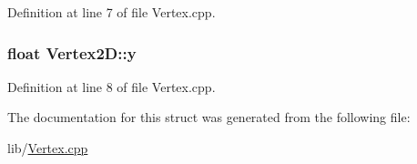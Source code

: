 Definition at line 7 of file Vertex.\+cpp.

\subsubsection[{\texorpdfstring{y}{y}}]{\setlength{\rightskip}{0pt plus 5cm}float Vertex2\+D\+::y}\hypertarget{struct_vertex2_d_ac3948cfb8740e52bfa30daaf17cc5043}{}\label{struct_vertex2_d_ac3948cfb8740e52bfa30daaf17cc5043}


Definition at line 8 of file Vertex.\+cpp.



The documentation for this struct was generated from the following file\+:\begin{DoxyCompactItemize}
\item 
lib/\hyperlink{_vertex_8cpp}{Vertex.\+cpp}\end{DoxyCompactItemize}
